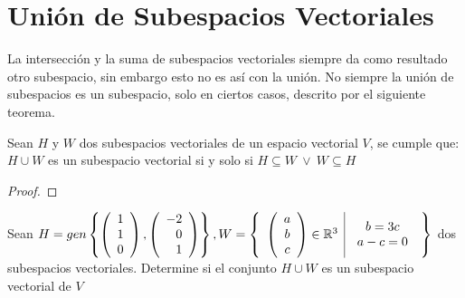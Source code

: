 \newpage

\section{Unión de Subespacios Vectoriales}
La intersección y la suma de subespacios vectoriales siempre da como resultado otro subespacio, sin embargo esto no es así con la unión. No siempre la unión de subespacios es un subespacio, solo en ciertos casos, descrito por el siguiente teorema.
\begin{theorem}
Sean $H$ y $W$ dos subespacios vectoriales de un espacio vectorial $V$, se cumple que: $H \cup W$ es un subespacio vectorial si y solo si $H \subseteq W \ \lor \ W \subseteq H$
\end{theorem}
\begin{proof}

\end{proof}
\begin{ejemplo}
Sean $H = gen \left\{\left( \begin{array}{r} 1\\ 1\\ 0 \end{array} \right) ,\left( \begin{array}{r} -2\\ 0\\ 1 \end{array} \right)  \right\} , W= \left\{\begin{array}{c|c} {\left( \begin{array}{c} a\\ b\\ c \end{array}\right) \in \mathbb{R}^3 }&{\begin{array}{c}
    b = 3c\\
    a-c=0
\end{array}} \end{array} \right\}$ dos subespacios vectoriales. Determine si el conjunto $H \cup W$ es un subespacio vectorial de $V$
\end{ejemplo}
